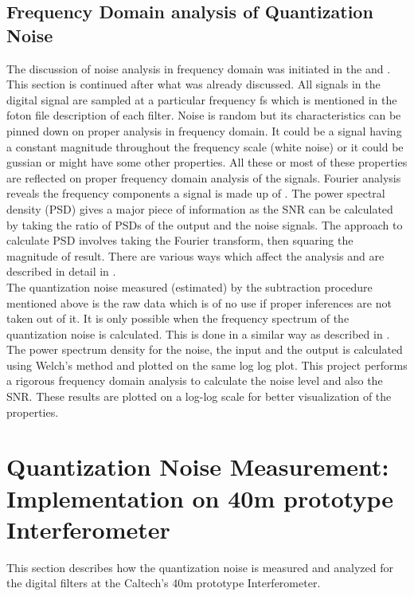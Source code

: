 \documentclass[colorlinks=true,pdfstartview=FitV,linkcolor=blue,
            citecolor=red,urlcolor=magenta]{ligodoc}
\begin{document}
	\subsection{Frequency Domain analysis of Quantization Noise} The discussion of noise analysis in frequency domain was initiated in the \cite{proposal} and \cite{reportI}. This section is continued after what was already discussed. All signals in the digital signal are sampled at a particular frequency fs which is mentioned in the foton file description of each filter. Noise is random but its characteristics can be pinned down on proper analysis in frequency domain. It could be a signal having a constant magnitude throughout the frequency scale (white noise) or it could be gussian or might have some other properties. All these or most of these properties are reflected on proper frequency domain analysis of the signals. Fourier analysis reveals the frequency components a signal is made up of \cite{Oppenheim}. The power spectral density (PSD) \cite{psd} gives a major piece of information as the SNR can be calculated by taking the ratio of PSDs of the output and the noise signals. The approach to calculate PSD involves taking the Fourier transform, then squaring the magnitude of result. There are various ways which affect the analysis and are described in detail in \cite{freq}. \\
	The quantization noise measured (estimated) by the subtraction procedure mentioned above is the raw data which is of no use if proper inferences are not taken out of it. It is only possible when the frequency spectrum of the quantization noise is calculated. This is done in a similar way as described in \cite{freq}. The power spectrum density for the noise, the input and the output is calculated using Welch's method \cite{Welch} and plotted on the same log log plot. 
	This project performs a rigorous frequency domain analysis to calculate the noise level and also the SNR. These results are plotted on a log-log scale for better visualization of the properties. 
\section{Quantization Noise Measurement: Implementation on 40m prototype Interferometer}
	This section describes how the quantization noise is measured and analyzed for the digital filters at the Caltech's 40m prototype Interferometer. 	
\end{document}
